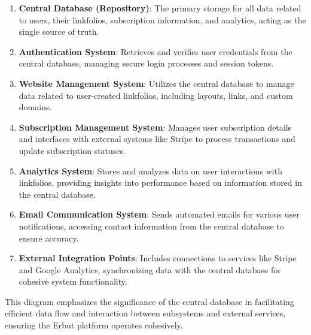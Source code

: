 \documentclass[a4paper]{report}
\begin{document}
\begin{enumerate}
    \item \textbf{Central Database (Repository)}: The primary storage for all data related to users, their linkfolios, subscription information, and analytics, acting as the single source of truth.
    \item \textbf{Authentication System}: Retrieves and verifies user credentials from the central database, managing secure login processes and session tokens.
    \item \textbf{Website Management System}: Utilizes the central database to manage data related to user-created linkfolios, including layouts, links, and custom domains.
    \item \textbf{Subscription Management System}: Manages user subscription details and interfaces with external systems like Stripe to process transactions and update subscription statuses.
    \item \textbf{Analytics System}: Stores and analyzes data on user interactions with linkfolios, providing insights into performance based on information stored in the central database.
    \item \textbf{Email Communication System}: Sends automated emails for various user notifications, accessing contact information from the central database to ensure accuracy.
    \item \textbf{External Integration Points}: Includes connections to services like Stripe and Google Analytics, synchronizing data with the central database for cohesive system functionality.
\end{enumerate}

This diagram emphasizes the significance of the central database in facilitating efficient data flow and interaction between subsystems and external services, ensuring the Erbut platform operates cohesively.
\end{document}
